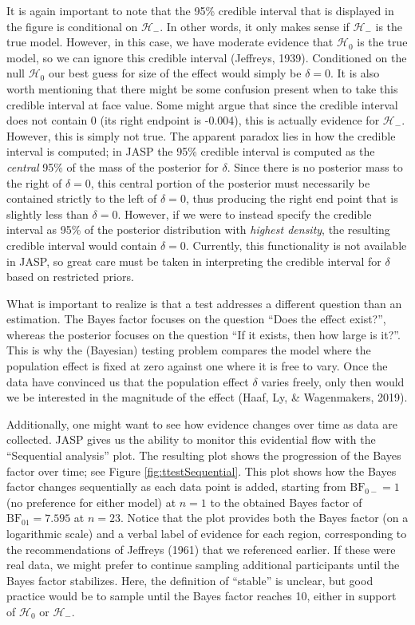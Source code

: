 \documentclass[english,,doc,floatsintext]{apa6}
\begin{document}
It is again important to note that the 95\% credible interval that is displayed in the figure is conditional on \(\mathcal{H}_{-}\). In other words, it only makes sense if \(\mathcal{H}_{-}\) is the true model. However, in this case, we have moderate evidence that \(\mathcal{H}_{0}\) is the true model, so we can ignore this credible interval (Jeffreys, 1939). Conditioned on the null \(\mathcal{H}_{0}\) our best guess for size of the effect would simply be \(\delta = 0\). It is also worth mentioning that there might be some confusion present when to take this credible interval at face value. Some might argue that since the credible interval does not contain 0 (its right endpoint is -0.004), this is actually evidence for \(\mathcal{H}_{-}\). However, this is simply not true. The apparent paradox lies in how the credible interval is computed; in JASP the 95\% credible interval is computed as the \emph{central} 95\% of the mass of the posterior for \(\delta\). Since there is no posterior mass to the right of \(\delta=0\), this central portion of the posterior must necessarily be contained strictly to the left of \(\delta=0\), thus producing the right end point that is slightly less than \(\delta=0\). However, if we were to instead specify the credible interval as 95\% of the posterior distribution with \emph{highest density}, the resulting credible interval would contain \(\delta=0\). Currently, this functionality is not available in JASP, so great care must be taken in interpreting the credible interval for \(\delta\) based on restricted priors.

What is important to realize is that a test addresses a different question than an estimation. The Bayes factor focuses on the question \enquote{Does the effect exist?}, whereas the posterior focuses on the question \enquote{If it exists, then how large is it?}. This is why the (Bayesian) testing problem compares the model where the population effect is fixed at zero against one where it is free to vary. Once the data have convinced us that the population effect \(\delta\) varies freely, only then would we be interested in the magnitude of the effect (Haaf, Ly, \& Wagenmakers, 2019).

Additionally, one might want to see how evidence changes over time as data are collected. JASP gives us the ability to monitor this evidential flow with the \enquote{Sequential analysis} plot. The resulting plot shows the progression of the Bayes factor over time; see Figure \ref{fig:ttestSequential}. This plot shows how the Bayes factor changes sequentially as each data point is added, starting from \(\text{BF}_{0-}=1\) (no preference for either model) at \(n=1\) to the obtained Bayes factor of \(\text{BF}_{01}=7.595\) at \(n=23\). Notice that the plot provides both the Bayes factor (on a logarithmic scale) and a verbal label of evidence for each region, corresponding to the recommendations of Jeffreys (1961) that we referenced earlier. If these were real data, we might prefer to continue sampling additional participants until the Bayes factor stabilizes. Here, the definition of \enquote{stable} is unclear, but good practice would be to sample until the Bayes factor reaches 10, either in support of \(\mathcal{H}_{0}\) or \(\mathcal{H}_{-}\).
\end{document}
